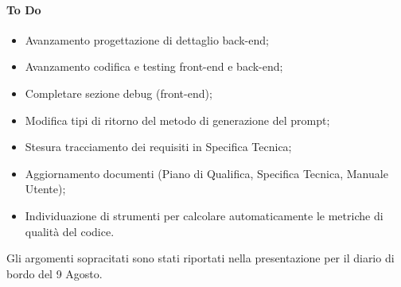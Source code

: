 \paragraph{To Do}
\begin{itemize}
	\item Avanzamento progettazione di dettaglio back-end;
	\item Avanzamento codifica e testing front-end e back-end;
	\item Completare sezione debug (front-end);
	\item Modifica tipi di ritorno del metodo di generazione del prompt;
	\item Stesura tracciamento dei requisiti in Specifica Tecnica;
	\item Aggiornamento documenti (Piano di Qualifica, Specifica Tecnica, Manuale Utente);
	\item Individuazione di strumenti per calcolare automaticamente le metriche di qualità del codice.
\end{itemize}

\vspace{0.5\baselineskip}
\par Gli argomenti sopracitati sono stati riportati nella presentazione per il diario di bordo del 9 Agosto.


